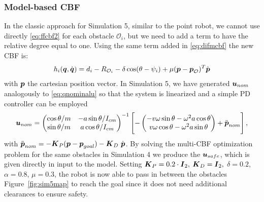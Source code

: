\subsubsection{Model-based CBF}
In the classic approach for Simulation 5, similar to the point robot, we cannot use directly \eqref{eq:ffcbf2} for each obstacle $\mathcal{O}_i$, but we need to add a term to have the relative degree equal to one. Using the same term added in \eqref{eq:difmcbf} the new CBF is:
\begin{equation}
   h_i({\boldsymbol{q}},\dot{\boldsymbol{q}}) = d_i-R_{\mathcal{O}_i}-\delta \cos(\theta - \psi_i)+\mu(\boldsymbol{p}-\boldsymbol{p}_\mathcal{O})^T\dot{\boldsymbol{p}}
   \label{eq:ffcbf2}
\end{equation}
with $\boldsymbol{p}$ the cartesian position vector. In Simulation 5, we have generated $\boldsymbol{u}_{nom}$ analogously to \eqref{eq:qnominalu} so that the system is linearized and a simple PD controller can be employed
    \begin{equation}
          \boldsymbol{u}_{nom}= \begin{pmatrix}
      \cos\theta/m & -a\sin\theta/I_{cm} \\
       \sin\theta/m & a\cos\theta/I_{cm}
    \end{pmatrix}^{-1} 
     \begin{bmatrix}
     - \begin{pmatrix}
     -v\omega\sin\theta-\omega^2a\cos\theta \\
        v\omega\cos\theta-\omega^2a\sin\theta
         \end{pmatrix}
           + \ddot{\boldsymbol{p}}_{nom}
         \end{bmatrix},
    \end{equation}
with  $\ddot{\boldsymbol{p}}_{nom} = -\boldsymbol{K}_P(\boldsymbol{p}-\boldsymbol{p}_{goal})-\boldsymbol{K}_D~\dot{\boldsymbol{p}}$. By solving the multi-CBF optimization problem for the same obstacles in Simulation 4 we produce the $\boldsymbol{u}_{safe}$, which is given directly in input to the model. Setting $\boldsymbol{K}_P = 0.2\cdot\boldsymbol{I}_2,$ $\boldsymbol{K}_D = \boldsymbol{I}_2,$ $\delta = 0.2$, $\alpha = 0.8$, $\mu = 0.3$, the robot is now able to pass in between the obstacles Figure~\ref{fig:sim5map} to reach the goal since it does not need additional clearances to ensure safety.
